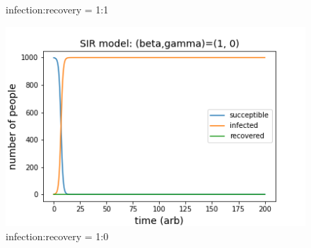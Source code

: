 \documentclass{article}
\begin{document}
\begin{figure}[!htb]
\begin{minipage}{0.48\textwidth}
     \caption{infection:recovery = 1:1}
    \end{minipage}
      \begin{minipage}{0.48\textwidth}
     \centering
     \includegraphics[width=1\linewidth]{fig34.png}
     \caption{infection:recovery = 1:0}
    \end{minipage}
\end{figure}
\end{document}
